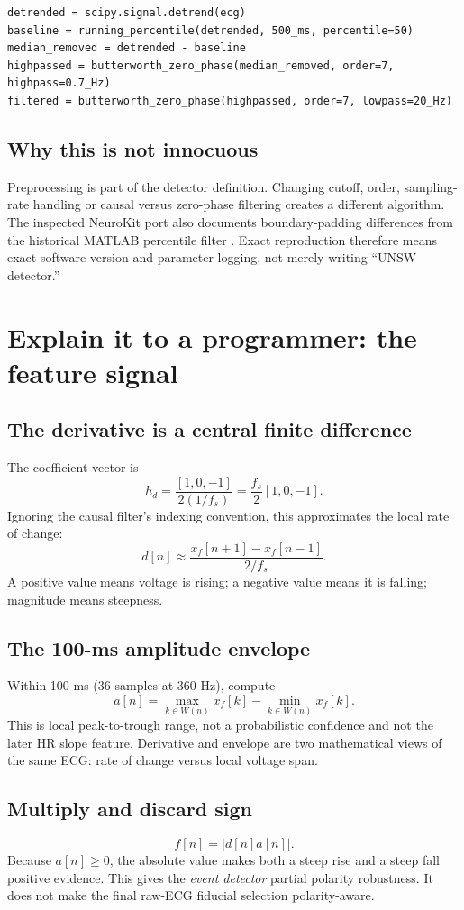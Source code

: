 \documentclass[11pt]{article}
\begin{document}
\begin{lstlisting}[caption={Programmer-level skeleton; exact helper details are documented later.}]
detrended = scipy.signal.detrend(ecg)
baseline = running_percentile(detrended, 500_ms, percentile=50)
median_removed = detrended - baseline
highpassed = butterworth_zero_phase(median_removed, order=7, highpass=0.7_Hz)
filtered = butterworth_zero_phase(highpassed, order=7, lowpass=20_Hz)
\end{lstlisting}

\subsection{Why this is not innocuous}
Preprocessing is part of the detector definition.  Changing cutoff, order, sampling-rate handling or causal versus zero-phase filtering creates a different algorithm.  The inspected NeuroKit port also documents boundary-padding differences from the historical MATLAB percentile filter \cite{neurokitpeaksource}.  Exact reproduction therefore means exact software version and parameter logging, not merely writing ``UNSW detector.''

\clearpage
\section{Explain it to a programmer: the feature signal}
\subsection{The derivative is a central finite difference}
The coefficient vector is
\[
h_d=\frac{[1,0,-1]}{2(1/f_s)}=\frac{f_s}{2}[1,0,-1].
\]
Ignoring the causal filter's indexing convention, this approximates the local rate of change:
\[
d[n]\approx\frac{x_f[n+1]-x_f[n-1]}{2/f_s}.
\]
A positive value means voltage is rising; a negative value means it is falling; magnitude means steepness.

\subsection{The 100-ms amplitude envelope}
Within 100 ms (36 samples at 360 Hz), compute
\[
a[n]=\max_{k\in W(n)}x_f[k]-\min_{k\in W(n)}x_f[k].
\]
This is local peak-to-trough range, not a probabilistic confidence and not the later HR slope feature.  Derivative and envelope are two mathematical views of the same ECG: rate of change versus local voltage span.

\subsection{Multiply and discard sign}
\[
f[n]=|d[n]a[n]|.
\]
Because \(a[n]\ge0\), the absolute value makes both a steep rise and a steep fall positive evidence.  This gives the \emph{event detector} partial polarity robustness.  It does not make the final raw-ECG fiducial selection polarity-aware.
\end{document}
